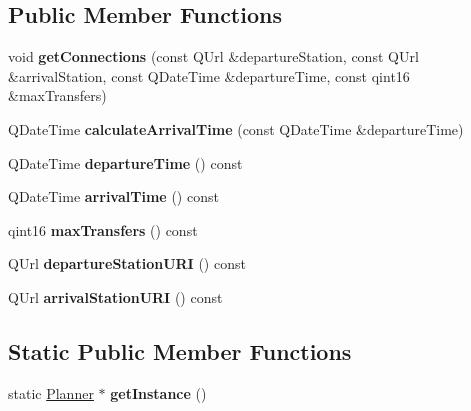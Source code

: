 \subsection*{Public Member Functions}
\begin{DoxyCompactItemize}
\item 
\mbox{\label{classRouterEngine_1_1Planner_ad4d13efc9958b6641489808b0bc2895e}} 
void {\bfseries get\+Connections} (const Q\+Url \&departure\+Station, const Q\+Url \&arrival\+Station, const Q\+Date\+Time \&departure\+Time, const qint16 \&max\+Transfers)
\item 
\mbox{\label{classRouterEngine_1_1Planner_aabc46d28d07f0972ff20a41a69d11922}} 
Q\+Date\+Time {\bfseries calculate\+Arrival\+Time} (const Q\+Date\+Time \&departure\+Time)
\item 
\mbox{\label{classRouterEngine_1_1Planner_aacb44fb55e948fd01378e7a8b5fe38dc}} 
Q\+Date\+Time {\bfseries departure\+Time} () const
\item 
\mbox{\label{classRouterEngine_1_1Planner_ac9dec0f6e45efb87a601c78e561e9eb5}} 
Q\+Date\+Time {\bfseries arrival\+Time} () const
\item 
\mbox{\label{classRouterEngine_1_1Planner_af9f2bb74f0b4a557b3eed7ae8488b143}} 
qint16 {\bfseries max\+Transfers} () const
\item 
\mbox{\label{classRouterEngine_1_1Planner_a0aae4b211672051dadf9c8a832b0cb2b}} 
Q\+Url {\bfseries departure\+Station\+U\+RI} () const
\item 
\mbox{\label{classRouterEngine_1_1Planner_a246e95794a7af90b9fffc41a36de4b89}} 
Q\+Url {\bfseries arrival\+Station\+U\+RI} () const
\end{DoxyCompactItemize}
\subsection*{Static Public Member Functions}
\begin{DoxyCompactItemize}
\item 
\mbox{\label{classRouterEngine_1_1Planner_a28f31342a3167eb681b689898b784cc7}} 
static \mbox{\hyperlink{classRouterEngine_1_1Planner}{Planner}} $\ast$ {\bfseries get\+Instance} ()
\end{DoxyCompactItemize}
